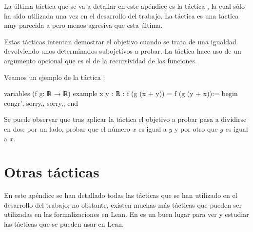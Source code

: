 La última táctica que se va a detallar en este apéndice es la táctica
, la cual sólo ha sido utilizada una vez en el
desarrollo del trabajo. La táctica  es una
táctica muy parecida a  pero menos agresiva que
esta última.

Estas tácticas intentan demostrar el objetivo cuando se trata de una
igualdad devolviendo unos determinados subojetivos a probar. La táctica
 hace uso de un argumento opcional que es el de
la recursividad de las funciones.

Veamos un ejemplo de la táctica :

\begin{leancode}
variables (f g: ℝ → ℝ)
example {x y : ℝ} : f (g (x + y)) = f (g (y + x)):=
begin
  congr',
  {sorry,},
  {sorry,},
end
\end{leancode}

Se puede observar que tras aplicar la táctica  el
objetivo a probar pasa a dividirse en dos: por un lado, probar que el número
\(x\) es igual a \(y\) y por otro que \(y\) es igual a \(x\).

\section{Otras tácticas}

En este apéndice se han detallado todas las tácticas que se han utilizado en
el desarrollo del trabajo; no obstante, existen muchas más tácticas que pueden
ser utilizadas en las formalizaciones en Lean. En \cite{tactic} es un buen
lugar para ver y estudiar las tácticas que se pueden usar en Lean.
